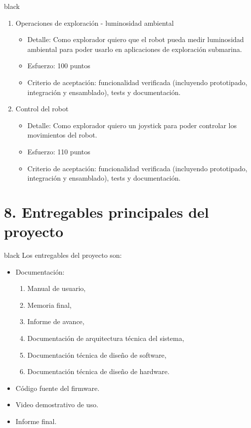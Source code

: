 \documentclass[
11pt, %
]{charter}
\begin{document}
\begin{consigna}{black}
\begin{enumerate}
	\item Operaciones de exploración - luminosidad ambiental
	\begin{itemize}
		\item Detalle: Como explorador quiero que el robot pueda medir luminosidad ambiental para poder usarlo en aplicaciones de exploración submarina.
		\item Esfuerzo: 100 puntos		
		\item Criterio de aceptación: funcionalidad verificada (incluyendo prototipado, integración y ensamblado), tests y documentación.
	\end{itemize}

	\item Control del robot
	\begin{itemize}
		\item Detalle: Como explorador quiero un joystick para poder controlar los movimientos del robot.
		\item Esfuerzo: 110 puntos		
		\item Criterio de aceptación: funcionalidad verificada (incluyendo prototipado, integración y ensamblado), tests y documentación.
	\end{itemize}

\end{enumerate}
\end{consigna}



\section{8. Entregables principales del proyecto}
\label{sec:entregables}
\begin{consigna}{black}
Los entregables del proyecto son:
\begin{itemize}
	\item Documentación:
	\begin{enumerate}				
		\item Manual de usuario,			
		\item Memoria final,
		\item Informe de avance,
		\item Documentación de arquitectura técnica del sistema,
		\item Documentación técnica de diseño de software,
		\item Documentación técnica de diseño de hardware.						
	\end{enumerate}	
	\item Código fuente del firmware.
	\item Video demostrativo de uso. 
	\item Informe final.
\end{itemize}
\end{consigna}
\end{document}

